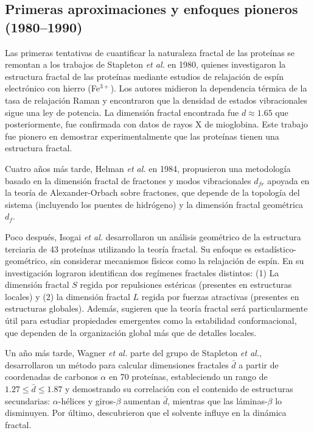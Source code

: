 \subsection{Primeras aproximaciones y enfoques pioneros (1980--1990)}

Las primeras tentativas de cuantificar la naturaleza fractal de las proteínas se remontan a los trabajos de Stapleton \textit{et al.}\cite{Stapleton1980} en 1980, quienes investigaron la estructura fractal de las proteínas mediante estudios de relajación de espín electrónico con hierro (Fe$^{3+}$). Los autores midieron la dependencia térmica de la tasa de relajación Raman y encontraron que la densidad de estados vibracionales sigue una ley de potencia. La dimensión fractal encontrada fue $d \approx 1.65$ que posteriormente, fue confirmada con datos de rayos X de mioglobina. Este trabajo fue pionero en demostrar experimentalmente que las proteínas tienen una estructura fractal. 

Cuatro años más tarde, Helman \textit{et al.}\cite{Helman1984} en 1984, propusieron una metodología basado en la dimensión fractal de fractones y modos vibracionales $d_{fr}$ apoyada en la teoría de Alexander-Orbach \cite{Alexander1982} sobre fractones, que depende de la topología del sistema (incluyendo los puentes de hidrógeno) y la dimensión fractal geométrica $d_f$.

Poco después, Isogai \textit{et al.} \cite{Isogai1984} desarrollaron un análisis geométrico de la estructura terciaria de 43 proteínas utilizando la teoría fractal. Su enfoque es estadístico-geométrico, sin considerar mecanismos físicos como la relajación de espín.
En su investigación lograron identifican dos regímenes fractales distintos: (1) La dimensión fractal $S$ regida por repulsiones estéricas (presentes en estructuras locales) y (2) la dimensión fractal $L$ regida por fuerzas atractivas (presentes en estructuras globales). Además, sugieren que la teoría fractal será particularmente útil para estudiar propiedades emergentes como la estabilidad conformacional, que dependen de la organización global más que de detalles locales.

Un año más tarde, Wagner \textit{et al.} \cite{Wagner1985} parte  del grupo de Stapleton \textit{et al.}, desarrollaron un método para calcular dimensiones fractales $\bar{d}$ a partir de coordenadas de carbonos $\alpha$ en 70 proteínas, estableciendo un rango de $1.27 \leq \bar{d} \leq 1.87$ y demostrando su correlación con el contenido de estructuras secundarias: $\alpha$-hélices y giros-$\beta$ aumentan $\bar{d}$, mientras que las láminas-$\beta$ lo disminuyen. Por último, descubrieron que el solvente influye en la dinámica fractal.


